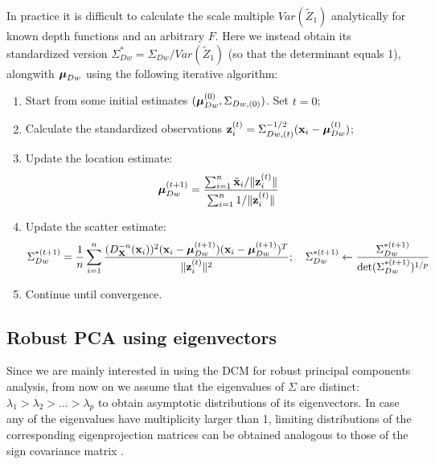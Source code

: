 In practice it is difficult to calculate the scale multiple $Var (\tilde Z_1)$ analytically for known depth functions and an arbitrary $F$. Here we instead obtain its standardized version $\Sigma_{Dw}^* = \Sigma_{Dw} / Var(\tilde Z_1)$ (so that the determinant equals 1), alongwith ${\boldsymbol{\mu}}_{Dw}$ using the following iterative algorithm:

\begin{enumerate}
\item Start from some initial estimates $({\boldsymbol{\mu}}_{Dw}^{(0)}, \Sigma_{Dw,(0)})$. Set $t=0$;

\item Calculate the standardized observations ${\bf{z}}_i^{(t)} = \Sigma_{Dw,(t)}^{-1/2} ({\bf{x}}_i - {\boldsymbol{\mu}}_{Dw}^{(t)})$;

\item Update the location estimate:
%
$$
{\boldsymbol{\mu}}_{Dw}^{(t+1)} = \frac{\sum_{i=1}^n \tilde {{\bf{x}}}_i / \| {\bf{z}}_i^{(t)} \| }{\sum_{i=1}^n 1 / \| {\bf{z}}_i^{(t)} \|}
$$
%
\item Update the scatter estimate:
%
$$
\Sigma_{Dw}^{*(t+1)} = \frac{1}{n} \sum_{i=1}^n \frac{(D^{-n}_{\mathbf{X}} ({\bf{x}}_i))^2 ({\bf{x}}_i - {\boldsymbol{\mu}}_{Dw}^{(t+1)})({\bf{x}}_i - {\boldsymbol{\mu}}_{Dw}^{(t+1)})^T}{\| {\bf{z}}_i^{(t)} \|^2}; \quad \Sigma_{Dw}^{*(t+1)} \leftarrow \frac{\Sigma_{Dw}^{*(t+1)}}{\text{det} (\Sigma_{Dw}^{*(t+1)})^{1/p}}
$$
%
\item Continue until convergence.
\end{enumerate}

\subsection{Robust PCA using eigenvectors}

Since we are mainly interested in using the DCM for robust principal components analysis, from now on we assume that the eigenvalues of $\Sigma$ are distinct: $\lambda_1 > \lambda_2 > ... > \lambda_p$ to obtain asymptotic distributions of its eigenvectors. In case any of the eigenvalues have multiplicity larger than 1, limiting distributions of the corresponding eigenprojection matrices can be obtained analogous to those of the sign covariance matrix \citep{magyar14}.

